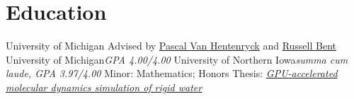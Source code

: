 \section{Education}
		{University of Michigan}{}{}
		{Advised by \href{http://pascalvanhentenryck.engin.umich.edu/}{Pascal Van Hentenryck} and \href{http://public.lanl.gov/rbent/}{Russell Bent}}
		{University of Michigan}{}{\textit{GPA 4.00/4.00}}
		{}
		{University of Northern Iowa}{}{\textit{summa cum laude, GPA 3.97/4.00}}
		{Minor: Mathematics; Honors Thesis: \href{http://www.tasseff.com/documents/reports/2012-gpu_accelerated_molecular_dynamics_simulation_of_rigid_water.pdf}{\textit{GPU-accelerated molecular dynamics simulation of rigid water}}}

